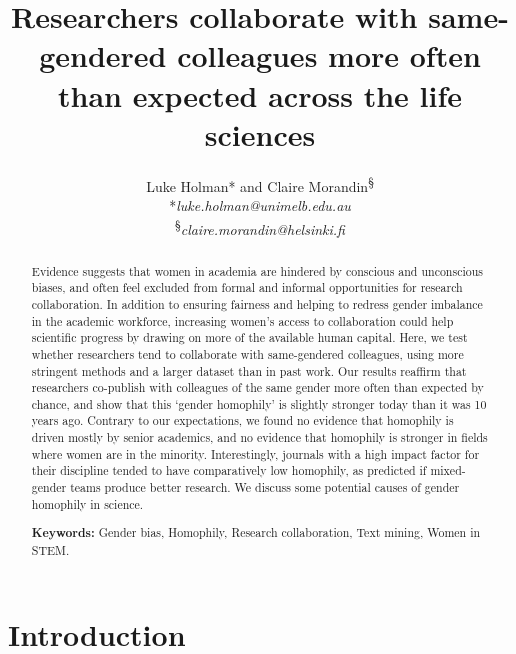 \documentclass[12pt,]{article}
\title{Researchers collaborate with same-gendered colleagues more often than
expected across the life sciences}
\author{Luke Holman* and Claire Morandin\textsuperscript{§} \\ *\textit{luke.holman@unimelb.edu.au} \\ \textsuperscript{§}\textit{claire.morandin@helsinki.fi} \vspace{5mm}}
\date{}
\begin{document}
\maketitle
\begin{abstract}
Evidence suggests that women in academia are hindered by conscious and
unconscious biases, and often feel excluded from formal and informal
opportunities for research collaboration. In addition to ensuring
fairness and helping to redress gender imbalance in the academic
workforce, increasing women's access to collaboration could help
scientific progress by drawing on more of the available human capital.
Here, we test whether researchers tend to collaborate with same-gendered
colleagues, using more stringent methods and a larger dataset than in
past work. Our results reaffirm that researchers co-publish with
colleagues of the same gender more often than expected by chance, and
show that this `gender homophily' is slightly stronger today than it was
10 years ago. Contrary to our expectations, we found no evidence that
homophily is driven mostly by senior academics, and no evidence that
homophily is stronger in fields where women are in the minority.
Interestingly, journals with a high impact factor for their discipline
tended to have comparatively low homophily, as predicted if mixed-gender
teams produce better research. We discuss some potential causes of
gender homophily in science. \vspace{5mm}

\par

\noindent \textbf{Keywords:} Gender bias, Homophily, Research
collaboration, Text mining, Women in STEM.
\end{abstract}

\maketitle{}
\maketitle{}

\newpage

\hypertarget{introduction}{%
\section{Introduction}\label{introduction}}
\end{document}
